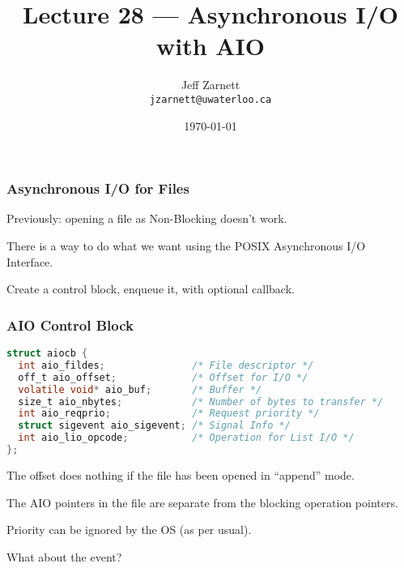 

\title{Lecture 28 --- Asynchronous I/O with AIO }

\author{Jeff Zarnett \\ \small \texttt{jzarnett@uwaterloo.ca}}
\date{\today}




\begin{frame}
	\titlepage

\end{frame}



\begin{frame}
	\frametitle{Asynchronous I/O for Files}

	Previously: opening a file as Non-Blocking doesn't work.

	There is a way to do what we want using the POSIX Asynchronous I/O Interface.

	Create a control block, enqueue it, with optional callback.

\end{frame}


\begin{frame}[fragile]
	\frametitle{AIO Control Block}

	\begin{lstlisting}[language=C]
struct aiocb {
  int aio_fildes;               /* File descriptor */
  off_t aio_offset;             /* Offset for I/O */
  volatile void* aio_buf;       /* Buffer */
  size_t aio_nbytes;            /* Number of bytes to transfer */
  int aio_reqprio;              /* Request priority */
  struct sigevent aio_sigevent; /* Signal Info */
  int aio_lio_opcode;           /* Operation for List I/O */
};
\end{lstlisting}

	The offset does nothing if the file has been opened in ``append'' mode.

	The AIO pointers in the file are separate from the blocking operation pointers.

	Priority can be ignored by the OS (as per usual).

	What about the event?

\end{frame}


